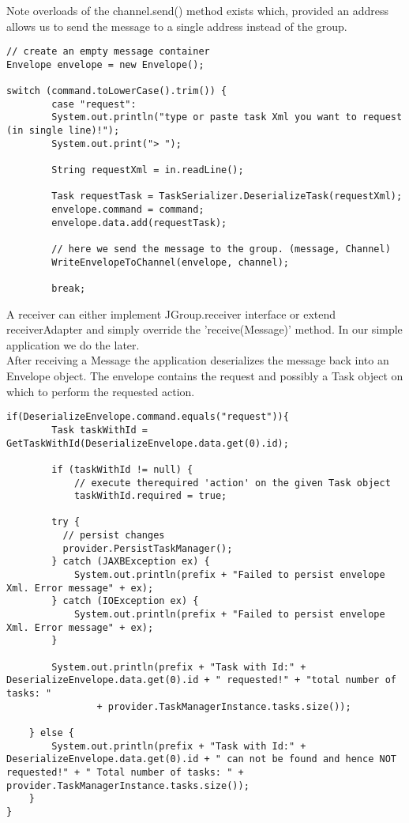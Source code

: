 Note overloads of the channel.send() method exists which, provided an address allows us to send the message to a single address instead of the group.

\pagebreak
\begin{lstlisting}[caption=eventloop]
// create an empty message container
Envelope envelope = new Envelope();

switch (command.toLowerCase().trim()) {
        case "request":
        System.out.println("type or paste task Xml you want to request (in single line)!");
        System.out.print("> ");
            		
        String requestXml = in.readLine();

        Task requestTask = TaskSerializer.DeserializeTask(requestXml);
        envelope.command = command;
        envelope.data.add(requestTask);

        // here we send the message to the group. (message, Channel)
        WriteEnvelopeToChannel(envelope, channel);
            		
   	   	break;

\end{lstlisting}

A receiver can either implement JGroup.receiver interface or extend receiverAdapter and simply override the 'receive(Message)' method. In our simple application we do the later. \\

After receiving a Message the application deserializes the message back into an Envelope object. The envelope contains the request and possibly a Task object on which to perform the requested action.

\begin{lstlisting}[caption=receiver]
if(DeserializeEnvelope.command.equals("request")){
	    Task taskWithId = GetTaskWithId(DeserializeEnvelope.data.get(0).id);
		
	    if (taskWithId != null) {
		    // execute therequired 'action' on the given Task object
	      	taskWithId.required = true;
		
	    try {
		  // persist changes
		  provider.PersistTaskManager();
	    } catch (JAXBException ex) {
	        System.out.println(prefix + "Failed to persist envelope Xml. Error message" + ex);
	    } catch (IOException ex) {
	        System.out.println(prefix + "Failed to persist envelope Xml. Error message" + ex);
	    }
		
	    System.out.println(prefix + "Task with Id:" + DeserializeEnvelope.data.get(0).id + " requested!" + "total number of tasks: "
	            + provider.TaskManagerInstance.tasks.size());
		
	} else {
	    System.out.println(prefix + "Task with Id:" + DeserializeEnvelope.data.get(0).id + " can not be found and hence NOT requested!" + " Total number of tasks: " + provider.TaskManagerInstance.tasks.size());
	}
}
\end{lstlisting}





